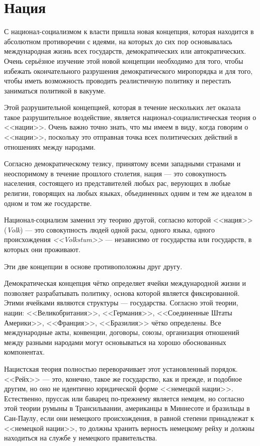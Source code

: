 \chapter{Нация}

С национал-социализмом к власти пришла новая концепция, которая находится в абсолютном противоречии с идеями, на которых до сих пор основывалась международная жизнь всех государств, демократических или автократических. Очень серьёзное изучение этой новой концепции необходимо для того, чтобы избежать окончательного разрушения демократического миропорядка и для того, чтобы иметь возможность проводить реалистичную политику и перестать заниматься политикой в вакууме.
 
Этой разрушительной концепцией, которая в течение нескольких лет оказала такое разрушительное воздействие, является национал-социалистическая теория о <<нации>>. Очень важно точно знать, что мы имеем в виду, когда говорим о <<нации>>, поскольку это отправная точка всех политических действий в отношениях между народами.

Согласно демократическому тезису, принятому всеми западными странами и неоспоримому в течение прошлого столетия, нация — это совокупность населения, состоящего из представителей любых рас, верующих в любые религии, говорящих на любых языках, объединенных одним и тем же идеалом в одном и том же государстве.

\sloppy Национал-социализм заменил эту теорию другой, согласно которой <<нация>> (\textit{Volk}) — это совокупность людей одной расы, одного языка, одного происхождения \textit{<<Volkstum>>} — независимо от государства или государств, в которых они проживают.

Эти две концепции в основе противоположны друг другу.

Демократическая концепция чётко определяет ячейки международной жизни и позволяет разрабатывать политику, основа которой является фиксированной. Этими ячейками являются структуры — государства. Согласно этой теории, нации: <<Великобритания>>, <<Германия>>, <<Соединенные Штаты Америки>>, <<Франция>>, <<Бразилия>> чётко определены. Все международные акты, конвенции, договоры, союзы, организация отношений между разными народами могут основываться на хорошо обоснованных компонентах.

\sloppy Нацистская теория полностью переворачивает этот установленный порядок. <<Рейх>> — это, конечно, такое же государство, как и прежде, и подобное другим, но оно не идентично юридической форме <<немецкой нации>>. Естественно, пруссак или баварец по-прежнему является немцем, но согласно этой теории румыны в Трансильвании, американцы в Миннесоте и бразильцы в Сан-Паулу, если они немецкого происхождения, в равной степени принадлежат к <<немецкой нации>>, то должны хранить верность немецкому рейху и должны находиться на службе у немецкого правительства.

